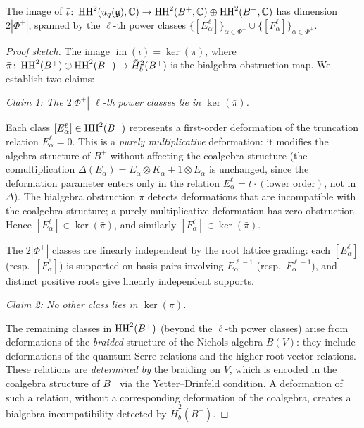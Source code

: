 \begin{proposition}
\label{prop:image}
The image of $\bar\iota \colon \operatorname{HH}^2(u_q(\mathfrak{g}), \mathbb{C}) \to \operatorname{HH}^2(B^+, \mathbb{C}) \oplus \operatorname{HH}^2(B^-, \mathbb{C})$ has dimension $2|\Phi^+|$, spanned by the $\ell$-th power classes $\{[E_\alpha^\ell]\}_{\alpha \in \Phi^+} \cup \{[F_\alpha^\ell]\}_{\alpha \in \Phi^+}$.
\end{proposition}

\begin{proof}[Proof sketch]
The image $\operatorname{im}(\bar\iota) = \ker(\bar\pi)$, where $\bar\pi \colon \operatorname{HH}^2(B^+) \oplus \operatorname{HH}^2(B^-) \to \tilde{H}^2_b(B^+)$ is the bialgebra obstruction map. We establish two claims:

\emph{Claim 1: The $2|\Phi^+|$ $\ell$-th power classes lie in $\ker(\bar\pi)$.}

Each class $[E_\alpha^\ell] \in \operatorname{HH}^2(B^+)$ represents a first-order deformation of the truncation relation $E_\alpha^\ell = 0$. This is a \emph{purely multiplicative} deformation: it modifies the algebra structure of $B^+$ without affecting the coalgebra structure (the comultiplication $\Delta(E_\alpha) = E_\alpha \otimes K_\alpha + 1 \otimes E_\alpha$ is unchanged, since the deformation parameter enters only in the relation $E_\alpha^\ell = t \cdot (\text{lower order})$, not in $\Delta$). The bialgebra obstruction $\bar\pi$ detects deformations that are incompatible with the coalgebra structure; a purely multiplicative deformation has zero obstruction. Hence $[E_\alpha^\ell] \in \ker(\bar\pi)$, and similarly $[F_\alpha^\ell] \in \ker(\bar\pi)$.

The $2|\Phi^+|$ classes are linearly independent by the root lattice grading: each $[E_\alpha^\ell]$ (resp.\ $[F_\alpha^\ell]$) is supported on basis pairs involving $E_\alpha^{\ell-1}$ (resp.\ $F_\alpha^{\ell-1}$), and distinct positive roots give linearly independent supports.

\emph{Claim 2: No other class lies in $\ker(\bar\pi)$.}

The remaining classes in $\operatorname{HH}^2(B^+)$ (beyond the $\ell$-th power classes) arise from deformations of the \emph{braided} structure of the Nichols algebra $B(V)$: they include deformations of the quantum Serre relations and the higher root vector relations. These relations are \emph{determined by} the braiding on $V$, which is encoded in the coalgebra structure of $B^+$ via the Yetter--Drinfeld condition. A deformation of such a relation, without a corresponding deformation of the coalgebra, creates a bialgebra incompatibility detected by $\tilde{H}^2_b(B^+)$.


\end{proof}
